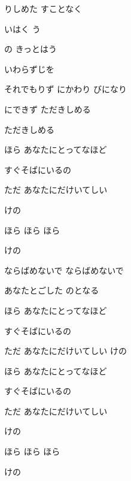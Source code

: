 \documentclass[14pt]{ltjsarticle}
\begin{document}
{  りしめた すことなく
  \jisho{}

  いはく う
  \jisho{}

\item
  の きっとはう
  \jisho{}

  いわらずじを
  \jisho{}

  
それでもりず にかわり びになり
  \jisho{}

  にできず ただきしめる
  \jisho{}

  
ただきしめる
  \jisho{}

\item
  
ほら あなたにとってなほど
  \jisho{}

  
すぐそばにいるの
  \jisho{}

  
ただ あなたにだけいてしい
  \jisho{}

  けの
  \jisho{}

  
ほら ほら ほら
  \jisho{}

  けの
  \jisho{}

\item
  ならばめないで ならばめないで
  \jisho{}

  
あなたとごした のとなる
  \jisho{}

  
ほら あなたにとってなほど
  \jisho{}

  
すぐそばにいるの
  \jisho{}

  
ただ あなたにだけいてしい けの
  \jisho{}

\item
  
ほら あなたにとってなほど
  \jisho{}

  
すぐそばにいるの
  \jisho{}

  
ただ あなたにだけいてしい
  \jisho{}

  けの
  \jisho{}

\item
  
ほら ほら ほら
  \jisho{}

  けの
  \jisho{}

}
\end{document}
